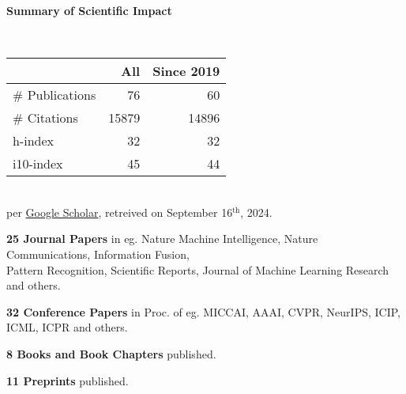 \headedsection %
{\bf Summary of Scientific Impact}{}{}
{
    \qquad~~~~
    \begin{minipage}[t]{0.6\textwidth}
        \begin{tabular}{lrr}
        \hline
         & All & Since 2019\\
        \hline
        \# Publications & 76     & 60    \\
        \# Citations    & 15879  & 14896 \\
        h-index         & 32     & 32    \\
        i10-index       & 45     & 44    \\
        \hline
    \end{tabular}
    \\
    {\footnotesize{
        per \href{https://scholar.google.com/citations?user=wpLQuroAAAAJ}{Google Scholar},
        retreived on September 16$^\text{th}$, 2024. 
        }
    }
    \end{minipage}

    \ifdefined\shortcv
        \vstep
        {\bf 25 Journal Papers} in eg. Nature Machine Intelligence, Nature Communications, Information Fusion,\\
        \hspace*{\fill} Pattern Recognition, Scientific Reports, Journal of Machine Learning Research and others.

        {\bf 32 Conference Papers} in Proc. of eg. MICCAI, AAAI, CVPR, NeurIPS, ICIP, ICML, ICPR and others.

        {\bf 8 Books and Book Chapters} published.

        {\bf 11 Preprints} published.
        
    \else
        {}
    \fi

}
